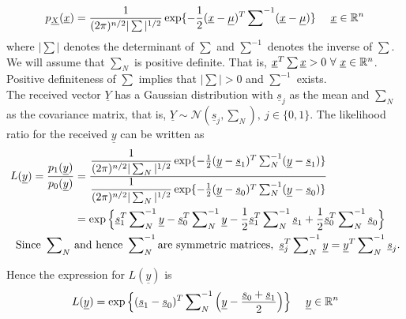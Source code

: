 \documentclass[a4paper,english,12pt]{article}
\begin{document}
\begin{equation}
p_{\underline{X}}(\underline{x})=\dfrac{1}{(2\pi)^{n/2} \vert \sum \vert ^{1/2}  } \exp \lbrace -\frac{1}{2} (\underline{x}-\underline{\mu})^T \sum\nolimits^{-1} (\underline{x} - \underline{\mu}) \rbrace \ \ \ \ \underline{x} \in \mathbb{R} ^n 
\end{equation}
where $\vert \sum \vert $ denotes the determinant of $\sum$ and $\sum ^{-1}$ denotes the inverse of $\sum$.\\
We will assume that $\sum _N$ is positive definite. That is, $\underline{x}^T\sum \underline{x} > 0 \ \forall \ \underline{x} \in \mathbb{R} ^n$. Positive definiteness of $\sum$ implies that $\vert \sum \vert > 0$ and $\sum ^{-1} $ exists.\\

The received vector $\underline{Y}$ has a Gaussian distribution with $\underline{s}_j$ as the mean and $\sum _N$ as the covariance matrix, that is, $\underline{Y} \sim \mathcal{N}(\underline{s}_j,\sum_N), \ j \in \lbrace 0,1 \rbrace$. The likelihood ratio for the received $\underline{y}$ can be written as 
\begin{align*}
\centering
L(\underline{y})=\dfrac{p_1(\underline{y})}{p_0 (\underline{y})} &=
\dfrac{\dfrac{1}{(2\pi)^{n/2} \vert \sum_N \vert ^{1/2}  } \exp \lbrace -\frac{1}{2} (\underline{y}-\underline{s}_1)^T \sum\nolimits^{-1}_N (\underline{y} - \underline{s}_1) \rbrace}{\dfrac{1}{(2\pi)^{n/2} \vert \sum_N \vert ^{1/2}  } \exp \lbrace -\frac{1}{2} (\underline{y}-\underline{s}_0)^T \sum\nolimits^{-1}_N (\underline{y} - \underline{s}_0) \rbrace}  \\
\vspace{0.2 cm}
&= \exp\Big \lbrace \underline{s}_1^T \sum\nolimits_N^{-1} \underline{y} - \underline{s}_0^T \sum\nolimits_N^{-1} \underline{y} -\frac{1}{2}\underline{s}_1^T \sum\nolimits_N^{-1} \underline{s}_1 + \frac{1}{2}\underline{s}_0^T \sum\nolimits_N^{-1} \underline{s}_0 \Big \rbrace\\ 
\vspace{0.25 cm}
\mbox{Since} \ \sum\nolimits _N  \ &\mbox{and hence} \  \sum\nolimits_N^{-1} \mbox{are symmetric matrices} , \ 
\underline{s}_j^T \sum\nolimits_N^{-1}\underline{y} = \underline{y}^T\sum\nolimits _N^{-1} \underline{s}_j  .
\end{align*}

Hence the expression for $L(\underline{y})$ is
\begin{equation}
\label{LR}
L(\underline{y})= \exp \Big\{ (\underline{s}_1-\underline{s}_0)^T \sum\nolimits_N^{-1} \Big( \underline{y} - \frac{\underline{s}_0+\underline{s}_1}{2} \Big) \Big\} \ \ \ \ \underline{y} \in \R ^n
\end{equation}
\end{document}
